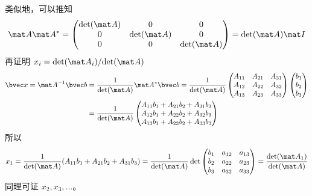 类似地，可以推知
\begin{equation}
\mat A \mat A^* =
\begin{pmatrix}
\det(\mat A)&0&0\\
0&\det(\mat A)&0\\
0&0&\det(\mat A)\\
\end{pmatrix}
=\det(\mat A) \mat I
\end{equation}
再证明 $x_i={\det(\mat A_i)}/{\det(\mat A)}$
$$
\begin{aligned}
\bvec x = \mat A^{-1} \bvec b &= \frac{1}{\det(\mat A)}\mat A^* \bvec b = 
\frac{1}{\det(\mat A)}
\begin{pmatrix}
A_{11}&A_{21}&A_{31}\\
A_{12}&A_{22}&A_{32}\\
A_{13}&A_{23}&A_{33}\\
\end{pmatrix}
\begin{pmatrix}
b_1\\
b_2\\
b_3\\
\end{pmatrix}\\
&=
\frac{1}{\det(\mat A)}
\begin{pmatrix}
A_{11}b_1+A_{21}b_2+A_{31}b_3\\
A_{12}b_1+A_{22}b_2+A_{32}b_3\\
A_{13}b_1+A_{23}b_2+A_{33}b_3\\
\end{pmatrix}
\end{aligned}
$$
所以
$$
x_1=\frac{1}{\det(\mat A)}(A_{11}b_1+A_{21}b_2+A_{31}b_3)
=\frac{1}{\det(\mat A)}\det
\begin{pmatrix}
b_{1}&a_{12}&a_{13}\\
b_{2}&a_{22}&a_{23}\\
b_{3}&a_{32}&a_{33}\\
\end{pmatrix}
=\frac{\det(\mat A_1)}{\det(\mat A)}
$$
同理可证 $x_2, x_3,...$。
